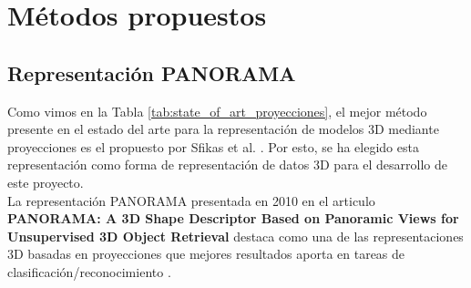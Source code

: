 \chapter{Métodos propuestos}
\label{chap:metodologia}


\section{Representación PANORAMA}

Como vimos en la Tabla \ref{tab:state_of_art_proyecciones}, el mejor método presente en el estado del arte para la representación de modelos 3D mediante proyecciones es el propuesto por Sfikas et al. \cite{SFIKAS2018208}. Por esto, se ha elegido esta representación como forma de representación de datos 3D para el desarrollo de este proyecto.\\

La representación PANORAMA presentada en 2010 en el articulo \textbf{PANORAMA: A 3D Shape Descriptor Based on Panoramic Views for Unsupervised 3D Object Retrieval} \cite{papadakis2010panorama} destaca como una de las representaciones 3D basadas en proyecciones que mejores resultados aporta en tareas de clasificación/reconocimiento  \cite{ahmed2018survey,sfikas2017exploiting,SFIKAS2018208}.\\


